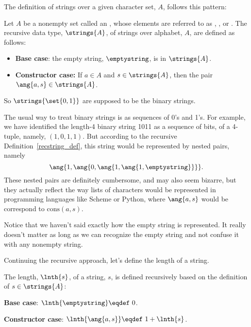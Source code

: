 The definition of strings over a given character set, $A$, follows this
pattern:

\begin{definition}\label{recstring_def}
  Let $A$ be a nonempty set called an , whose elements are
  referred to as , , or .
  The recursive data type, $\strings{A}$, of strings over alphabet, $A$,
  are defined as follows:
\begin{itemize}
\item \textbf{Base case}: the empty string, $\emptystring$, is in $\strings{A}$.

\item \textbf{Constructor case:} If $a \in A$ and $s \in \strings{A}$, then the pair
       $\ang{a,s} \in \strings{A}$.
\end{itemize}
\end{definition}
So $\strings{\set{0,1}}$ are supposed to be the binary strings.

The usual way to treat binary strings is as sequences of 0's and 1's.
For example, we have identified the length-4 binary string 1011 as a
sequence of bits, of a 4-tuple, namely, $(1,0,1,1)$.  But according to
the recursive Definition~\ref{recstring_def}, this string would be
represented by nested pairs, namely
\[
\ang{1,\ang{0,\ang{1,\ang{1,\emptystring}}}}.
\]
These nested pairs are definitely cumbersome, and may also seem
bizarre, but they actually reflect the way lists of characters would
be represented in programming languages like Scheme or Python, where
$\ang{a,s}$ would be correspond to $\text{cons}(a, s)$.

Notice that we haven't said exactly how the empty string is
represented.  It really doesn't matter as long as we can recognize the
empty string and not confuse it with any nonempty string.

Continuing the recursive approach, let's define the length of a string.
\begin{definition}
The length, $\lnth{s}$, of a string, $s$, is defined recursively
based on the definition of $s \in \strings{A}$:

\item \textbf{Base case}:  $\lnth{\emptystring} \eqdef\ 0$.

\item \textbf{Constructor case}: $\lnth{\ang{a,s}} \eqdef\ 1 + \lnth{s}$.

\end{definition}

